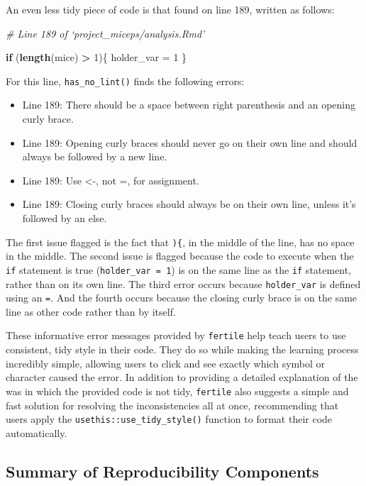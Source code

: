 \documentclass[12pt,twoside]{reedthesis}
\newenvironment{Shaded}{\begin{snugshade}}{\end{snugshade}}
\newcommand{\CommentTok}[1]{\textcolor[rgb]{0.56,0.35,0.01}{\textit{#1}}}
\newcommand{\ControlFlowTok}[1]{\textcolor[rgb]{0.13,0.29,0.53}{\textbf{#1}}}
\newcommand{\DecValTok}[1]{\textcolor[rgb]{0.00,0.00,0.81}{#1}}
\newcommand{\KeywordTok}[1]{\textcolor[rgb]{0.13,0.29,0.53}{\textbf{#1}}}
\newcommand{\NormalTok}[1]{#1}
\newcommand{\OperatorTok}[1]{\textcolor[rgb]{0.81,0.36,0.00}{\textbf{#1}}}
\newcommand{\StringTok}[1]{\textcolor[rgb]{0.31,0.60,0.02}{#1}}
\begin{document}
An even less tidy piece of code is that found on line 189, written as follows:
\begin{Shaded}
\begin{Highlighting}[]
\CommentTok{# Line 189 of `project_miceps/analysis.Rmd'}

\ControlFlowTok{if}\NormalTok{ (}\KeywordTok{length}\NormalTok{(mice) }\OperatorTok{>}\StringTok{ }\DecValTok{1}\NormalTok{)\{ holder_var =}\StringTok{ }\DecValTok{1}\NormalTok{ \}}
\end{Highlighting}
\end{Shaded}
For this line, \texttt{has\_no\_lint()} finds the following errors:
\begin{itemize}
\item
  Line 189: There should be a space between right parenthesis and an opening curly brace.
\item
  Line 189: Opening curly braces should never go on their own line and should always be followed by a new line.
\item
  Line 189: Use \textless-, not =, for assignment.
\item
  Line 189: Closing curly braces should always be on their own line, unless it's followed by an else.
\end{itemize}
The first issue flagged is the fact that \texttt{)\{}, in the middle of the line, has no space in the middle. The second issue is flagged because the code to execute when the \texttt{if} statement is true (\texttt{holder\_var\ =\ 1}) is on the same line as the \texttt{if} statement, rather than on its own line. The third error occurs because \texttt{holder\_var} is defined using an \texttt{=}. And the fourth occurs because the closing curly brace is on the same line as other code rather than by itself.

These informative error messages provided by \texttt{fertile} help teach users to use consistent, tidy style in their code. They do so while making the learning process incredibly simple, allowing users to click and see exactly which symbol or character caused the error. In addition to providing a detailed explanation of the was in which the provided code is not tidy, \texttt{fertile} also suggests a simple and fast solution for resolving the inconsistencies all at once, recommending that users apply the \texttt{usethis::use\_tidy\_style()} function to format their code automatically.

\hypertarget{summary-of-reproducibility-components}{%
\subsection{Summary of Reproducibility Components}\label{summary-of-reproducibility-components}}
\end{document}
